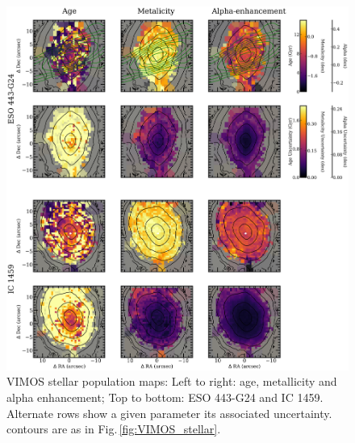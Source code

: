 		\begin{figure}
			\centering
			\includegraphics[height=0.63\textheight]{chapter4/vimos/pop1.png}
			\caption[VIMOS stellar population maps]{VIMOS stellar population maps: Left to right: age, metallicity and alpha enhancement; Top to bottom: ESO 443-G24 and IC 1459. Alternate rows show a given parameter its associated uncertainty. contours are as in Fig.\,\ref{fig:VIMOS_stellar}.}%
			\label{fig:VIMOS_pop}
		\end{figure}
